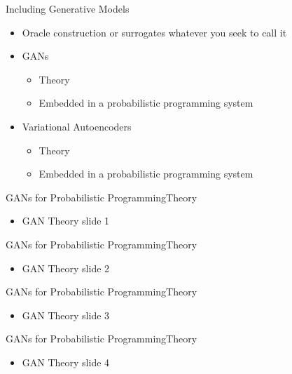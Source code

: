 \documentclass[AERbeamer%
              ,optEnglish%
              ,optBiber%
              ,optBibstyleAlphabetic%
              ,optBeamerClassicFormat%
              ]{AERlatex}%
\begin{document}
\begin{frame}[c]{Including Generative Models}
    \centering
    \begin{itemize}
        \item Oracle construction or surrogates whatever you seek to call it
        \item GANs
        \begin{itemize}
            \item Theory
            \item Embedded in a probabilistic programming system
        \end{itemize}
        \item Variational Autoencoders
        \begin{itemize}
            \item Theory
            \item Embedded in a probabilistic programming system
        \end{itemize}
    \end{itemize}
\end{frame}


\begin{frame}[c]{GANs for Probabilistic Programming}{Theory}
    \centering
    \begin{itemize}
        \item GAN Theory slide 1
    \end{itemize}
\end{frame}


\begin{frame}[c]{GANs for Probabilistic Programming}{Theory}
    \centering
    \begin{itemize}
        \item GAN Theory slide 2
    \end{itemize}
\end{frame}


\begin{frame}[c]{GANs for Probabilistic Programming}{Theory}
    \centering
    \begin{itemize}
        \item GAN Theory slide 3
    \end{itemize}
\end{frame}


\begin{frame}[c]{GANs for Probabilistic Programming}{Theory}
    \centering
    \begin{itemize}
        \item GAN Theory slide 4
    \end{itemize}
\end{frame}
\end{document}
